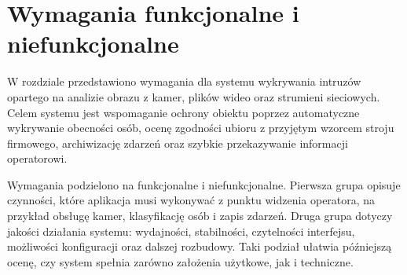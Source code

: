 \clearpage
\section{Wymagania funkcjonalne i niefunkcjonalne}		%

W rozdziale przedstawiono wymagania dla systemu wykrywania intruzów opartego na analizie obrazu z kamer, plików wideo oraz strumieni sieciowych. Celem systemu jest wspomaganie ochrony obiektu poprzez automatyczne wykrywanie obecności osób, ocenę zgodności ubioru z przyjętym wzorcem stroju firmowego, archiwizację zdarzeń oraz szybkie przekazywanie informacji operatorowi.

Wymagania podzielono na funkcjonalne i niefunkcjonalne. Pierwsza grupa opisuje czynności, które aplikacja musi wykonywać z punktu widzenia operatora, na przykład obsługę kamer, klasyfikację osób i zapis zdarzeń. Druga grupa dotyczy jakości działania systemu: wydajności, stabilności, czytelności interfejsu, możliwości konfiguracji oraz dalszej rozbudowy. Taki podział ułatwia późniejszą ocenę, czy system spełnia zarówno założenia użytkowe, jak i techniczne.

